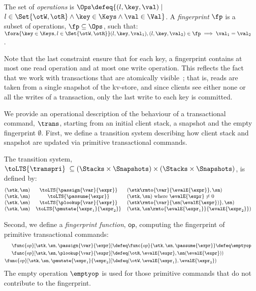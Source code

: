 \begin{definition}[Fingerprints]
\label{beebop}
\label{def:fingerprint}
The set of \emph{operations} is 
$\Ops \defeq \{(l, \key, \val) \mid$ $ l \in \Set{\otW, \otR} \land \key \in \Keys \wedge \val \in \Val \}$.
A \emph{fingerprint} $\fp$ is a subset of operations, $\fp \subseteq \Ops$,
such that: 
$\fora{\key \in \Keys, l  \in \Set{\otW, \otR}}
	(l, \key, \val_1), (l, \key, \val_2) \in \fp \implies \val_1 = \val_2$.
\end{definition}
Note that the last constraint ensure that for each key, a fingerprint contains at most one read operation and at most one write operation.
This reflects the fact that we work with transactions that are
atomically visible~\cite{laws}; 
that is, reads are taken from a single snapshot of the kv-store, 
and since clients see either none or all the writes of a transaction, only the last write to each key is 
committed.

We provide an operational description of the behaviour of a transactional command, $\trans$,
starting from an initial client stack, a snapshot and the empty fingerprint $\emptyset$. 
First, we define a transition system describing how client stack and snapshot are updated via
primitive transactional commands.


\begin{definition}
\label{def:primitive_semantics}
The transition system, $\toLTS{\transpri}\; \subseteq (\Stacks \times \Snapshots) \times (\Stacks \times \Snapshots)$, 
is defined by:
%
{%
\[
\small
\begin{array}{@{} r c l @{}}
(\stk, \sn)  & \toLTS{\passign{\var}{\expr}}          & (\stk\rmto{\var}{\evalE{\expr}}, \sn)                  \\
(\stk, \sn)  & \toLTS{\passume{\expr}}                & (\stk, \sn) \text{ where } \evalE{\expr} \neq 0        \\
(\stk, \sn)  
& \toLTS{ \plookup{\var}{\expr} } 
& (\stk\rmto{\var}{\sn(\evalE{\expr})}, \sn) 
\\
(\stk, \sn)
& \toLTS{\pmutate{\expr_{1}}{\expr_{2}}  }
& (\stk, \sn\rmto{\evalE{\expr_{1}}}{\evalE{\expr_{2}}}) \\
\end{array}
\]%
}%
%
\end{definition}
\noindent Second, we define a \emph{fingerprint function}, $\mathsf{op}$, computing the fingerprint of primitive transactional commands:
\[
\small
\begin{aligned}
\func{op}[\stk, \sn, \passign{\var}{\expr}]           & \defeq \func{op}{\stk, \sn, \passume{\expr}} \defeq \emptyop \\
\func{op}[\stk, \sn,  \plookup{\var}{\expr}]          & \defeq (\otR, \evalE{\expr}, \sn(\evalE{\expr})) \\
\func{op}[\stk,  \sn, \pmutate{\expr_{1}}{\expr_{2}}] & \defeq (\otW, \evalE{\expr_{1}}, \evalE{\expr_{2}})
\end{aligned}
\]
The  empty operation $\emptyop$ is used for those primitive commands that do not
contribute to the fingerprint.

